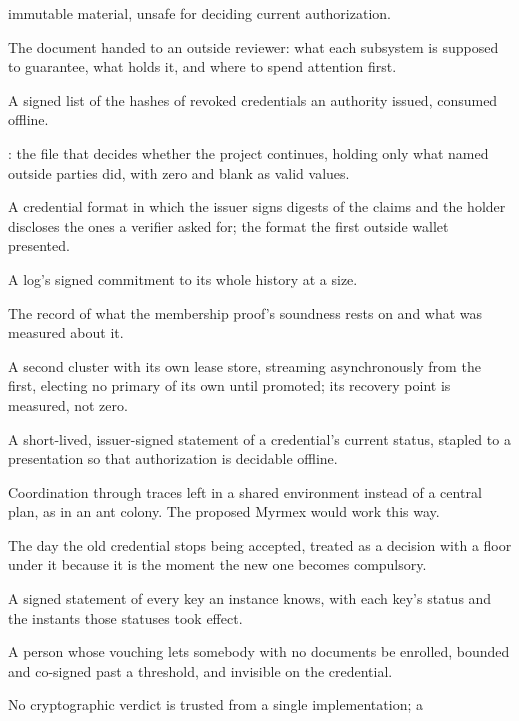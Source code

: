 \begin{description}
    immutable material, unsafe for deciding current authorization.
  \item[Review packet.] The document handed to an outside reviewer: what each subsystem is supposed to
    guarantee, what holds it, and where to spend attention first.
  \item[Revocation feed.] A signed list of the hashes of revoked credentials an authority issued,
    consumed offline.
  \item[Scoreboard.] : the file that decides whether the project
    continues, holding only what named outside parties did, with zero and blank as valid values.
  \item[SD-JWT VC.] A credential format in which the issuer signs digests of the claims and the holder
    discloses the ones a verifier asked for; the format the first outside wallet presented.
  \item[Signed tree head.] A log's signed commitment to its whole history at a size.
  \item[Soundness ledger.] The record of what the membership proof's soundness rests on and what was
    measured about it.
  \item[Standby region.] A second cluster with its own lease store, streaming asynchronously from the
    first, electing no primary of its own until promoted; its recovery point is measured, not zero.
  \item[Status assertion.] A short-lived, issuer-signed statement of a credential's current status,
    stapled to a presentation so that authorization is decidable offline.
  \item[Stigmergy.] Coordination through traces left in a shared environment instead of a central plan, as in
    an ant colony. The proposed Myrmex would work this way.
  \item[Sunset.] The day the old credential stops being accepted, treated as a decision with a floor
    under it because it is the moment the new one becomes compulsory.
  \item[Trust list.] A signed statement of every key an instance knows, with each key's status and
    the instants those statuses took effect.
  \item[Trusted referee.] A person whose vouching lets somebody with no documents be enrolled, bounded
    and co-signed past a threshold, and invisible on the credential.
  \item[Two-witness principle.] No cryptographic verdict is trusted from a single implementation; a

\end{description}
